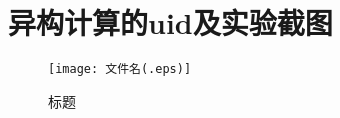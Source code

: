 \chapter{异构计算的uid及实验截图}
\begin{figure}[htbp]
    \centering
    \texttt{[image: 文件名(.eps)]}
    \caption{标题}\label{标签名(通常为 fig:labelname)}
    \vspace{\baselineskip} %
    \end{figure}